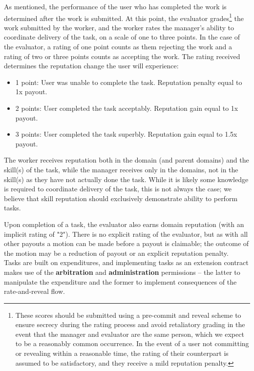 As mentioned, the performance of the user who has completed the work is determined after the work is submitted. At this point, the evaluator grades\footnote{These scores should be submitted using a pre-commit and reveal scheme to ensure secrecy during the rating process and avoid retaliatory grading in the event that the manager and evaluator are the same person, which we expect to be a reasonably common occurrence. In the event of a user not committing or revealing within a reasonable time, the rating of their counterpart is assumed to be satisfactory, and they receive a mild reputation penalty.} the work submitted by the worker, and the worker rates the manager's ability to coordinate delivery of the task, on a scale of one to three points. In the case of the evaluator, a rating of one point counts as them rejecting the work and a rating of two or three points counts as accepting the work. The rating received determines the reputation change the user will experience:

\begin{itemize}
 \item[]1 point:\phantom{s} User was unable to complete the task. Reputation penalty equal to 1x payout.
 \item[]2 points: User completed the task acceptably. Reputation gain equal to 1x payout.
 \item[]3 points: User completed the task superbly. Reputation gain equal to 1.5x payout.
\end{itemize}

The worker receives reputation both in the domain (and parent domains) and the skill(s) of the task, while the manager receives only in the domains, not in the skill(s) as they have not actually done the task. While it is likely some knowledge is required to coordinate delivery of the task, this is not always the case; we believe that skill reputation should exclusively demonstrate ability to perform tasks.

Upon completion of a task, the evaluator also earns domain reputation (with an implicit rating of "2"). There is no explicit rating of the evaluator, but as with all other payouts a motion can be made before a payout is claimable; the outcome of the motion may be a reduction of payout or an explicit reputation penalty. \\

Tasks are built on expenditures, and implementing tasks as an extension contract makes use of the \textbf{arbitration} and \textbf{administration} permissions -- the latter to manipulate the expenditure and the former to implement consequences of the rate-and-reveal flow.

